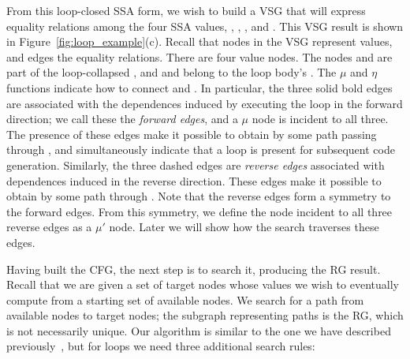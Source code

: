 \documentclass[12pt]{gatech-thesis}
\begin{document}
From this loop-closed SSA form, we wish to build a VSG that will express equality relations among the four SSA values, \vinit, \vfinal, \vmu, and \viter.
This VSG result is shown in Figure~\ref{fig:loop_example}(c).
Recall that nodes in the VSG represent values, and edges the equality relations.
%
%
%
There are four value nodes.
The nodes \vinit and \vfinal are part of the loop-collapsed \pVSG, and \vmu and \viter belong to the loop body's \lVSG.
The $\mu$ and $\eta$ functions indicate how to connect \pVSG and \lVSG.
In particular, the three solid bold edges are associated with the dependences induced by executing the loop in the forward direction;
we call these the \emph{forward edges}, and a $\mu$ node is incident to all three.
The presence of these edges make it possible to obtain \vfinal by some path passing through \lVSG, and simultaneously indicate that a loop is present for subsequent code generation.
Similarly, the three dashed edges are \emph{reverse edges} associated with dependences induced in the reverse direction.
These edges make it possible to obtain \vinit by some path through \lVSG.
Note that the reverse edges form a symmetry to the forward edges.
From this symmetry, we define the node incident to all three reverse edges as a $\mu'$ node.
Later we will show how the search traverses these edges.

Having built the CFG, the next step is to search it, producing the RG result.
Recall that we are given a set of target nodes whose values we wish to eventually compute from a starting set of available nodes.
We search for a path from available nodes to target nodes; the subgraph representing paths is the RG, which is not necessarily unique.
Our algorithm is similar to the one we have described previously~\cite{Hou2012}, but for loops we need three additional search rules:
\end{document}
